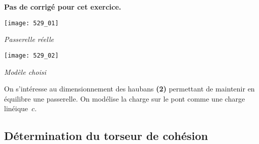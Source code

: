 \normaltrue
\correctionfalse


\setcounter{numques}{0}

\ifcorrection
\else
\textbf{Pas de corrigé pour cet exercice.}
\fi



\begin{center}
\texttt{[image: 529\_01]}

\textit{Passerelle réelle}
\end{center}

\begin{center}
\texttt{[image: 529\_02]}

\textit{Modèle choisi}
\end{center}

On s'intéresse au dimensionnement des haubans \textbf{(2)} permettant de maintenir en équilibre une passerelle.
On modélise la charge sur le pont comme une charge linéique~$c$.

\subsection*{Détermination du torseur de cohésion}
\ifprof
\begin{corrige}~\\
\end{corrige}
\else
\fi

\ifprof
\begin{corrige}~\\
\end{corrige}
\else
\fi

\ifprof
\begin{corrige}~\\
\end{corrige}
\else
\fi

\ifprof
\begin{corrige}~\\
\end{corrige}
\else
\fi


